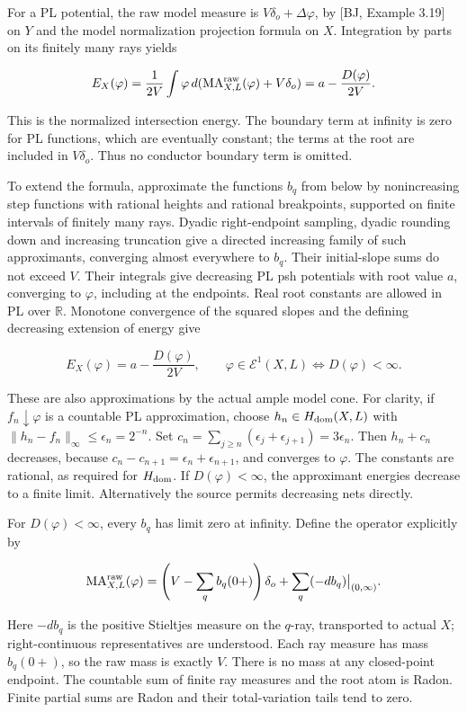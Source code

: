 \documentclass[11pt]{article}
\begin{document}
For a PL potential, the raw model measure is $V\delta_o+\Delta\varphi$, by [BJ, Example 3.19] on $Y$ and the model normalization projection formula on $X$. Integration by parts on its finitely many rays yields

\[
 E_X(\varphi)=\frac1{2V}\int\varphi\,d(\mathrm{MA}^{\rm raw}_{X,L}(\varphi)+V\delta_o)
 =a-\frac{D(\varphi)}{2V}.
\]

This is the normalized intersection energy. The boundary term at infinity is zero for PL functions, which are eventually constant; the terms at the root are included in $V\delta_o$. Thus no conductor boundary term is omitted.

To extend the formula, approximate the functions $b_q$ from below by nonincreasing step functions with rational heights and rational breakpoints, supported on finite intervals of finitely many rays. Dyadic right-endpoint sampling, dyadic rounding down and increasing truncation give a directed increasing family of such approximants, converging almost everywhere to $b_q$. Their initial-slope sums do not exceed $V$. Their integrals give decreasing PL psh potentials with root value $a$, converging to $\varphi$, including at the endpoints. Real root constants are allowed in PL over $\mathbb R$. Monotone convergence of the squared slopes and the defining decreasing extension of energy give

\[
 E_X(\varphi)=a-\frac{D(\varphi)}{2V},\qquad
 \varphi\in\mathcal E^1(X,L)\Longleftrightarrow D(\varphi)<\infty.
\]

These are also approximations by the actual ample model cone. For clarity, if $f_n\downarrow\varphi$ is a countable PL approximation, choose $h_n\in H_{\rm dom}(X,L)$ with $\|h_n-f_n\|_\infty\leq\epsilon_n=2^{-n}$. Set $c_n=\sum_{j\geq n}(\epsilon_j+\epsilon_{j+1})=3\epsilon_n$. Then $h_n+c_n$ decreases, because $c_n-c_{n+1}=\epsilon_n+\epsilon_{n+1}$, and converges to $\varphi$. The constants are rational, as required for $H_{\rm dom}$. If $D(\varphi)<\infty$, the approximant energies decrease to a finite limit. Alternatively the source permits decreasing nets directly.

For $D(\varphi)<\infty$, every $b_q$ has limit zero at infinity. Define the operator explicitly by

\[
 \mathrm{MA}^{\rm raw}_{X,L}(\varphi)
 =\left(V-\sum_q b_q(0+)\right)\delta_o
   +\sum_q(-db_q)\big|_{(0,\infty)}.
\]

Here $-db_q$ is the positive Stieltjes measure on the $q$-ray, transported to actual $X$; right-continuous representatives are understood. Each ray measure has mass $b_q(0+)$, so the raw mass is exactly $V$. There is no mass at any closed-point endpoint. The countable sum of finite ray measures and the root atom is Radon. Finite partial sums are Radon and their total-variation tails tend to zero.
\end{document}
